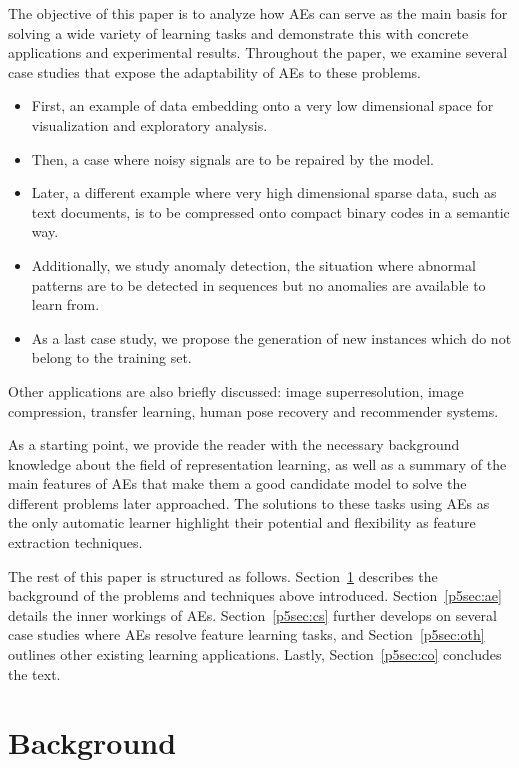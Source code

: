 The objective of this paper is to analyze how AEs can serve as the main basis for solving a wide variety of learning tasks and demonstrate this with concrete applications and experimental results. 
Throughout the paper, we examine several case studies that expose the adaptability of AEs to these problems.\begin{itemize}
    \item First, an example of data embedding onto a very low dimensional space for visualization and exploratory analysis. 
    \item Then, a case where noisy signals are to be repaired by the model.
    \item Later, a different example where very high dimensional sparse data, such as text documents, is to be compressed onto compact binary codes in a semantic way.
    \item Additionally, we study anomaly detection, the situation where abnormal patterns are to be detected in sequences but no anomalies are available to learn from.
    \item As a last case study, we propose the generation of new instances which do not belong to the training set.
\end{itemize}    

Other applications are also briefly discussed: image superresolution, image compression, transfer learning, human pose recovery and recommender systems. 

As a starting point, we provide the reader with the necessary background knowledge about the field of representation learning, as well as a summary of the main features of AEs that make them a good candidate model to solve the different problems later approached. The solutions to these tasks using AEs as the only automatic learner highlight their potential and flexibility as feature extraction techniques. 


The rest of this paper is structured as follows. Section~\ref{p5sec:bg} describes the background of the problems and techniques above introduced. Section~\ref{p5sec:ae} details the inner workings of AEs. Section~\ref{p5sec:cs} further develops on several case studies where AEs resolve feature learning tasks, and Section~\ref{p5sec:oth} outlines other existing learning applications. Lastly, Section~\ref{p5sec:co} concludes the text.

\section{Background}\label{p5sec:bg}

